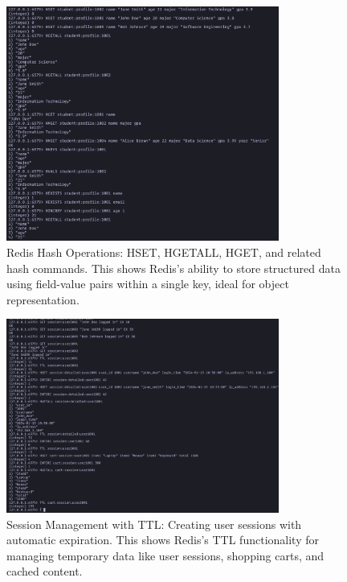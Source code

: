 \begin{figure}[H]
  \centering
  \includegraphics[width=0.8\textwidth]{task-4/screenshots/hash-operations.png}
  \caption{Redis Hash Operations: HSET, HGETALL, HGET, and related hash commands. This shows Redis's ability to store structured data using field-value pairs within a single key, ideal for object representation.}
  \label{fig:hash-operations}
\end{figure}

\begin{figure}[H]
  \centering
  \includegraphics[width=0.8\textwidth]{task-4/screenshots/session-details.png}
  \caption{Session Management with TTL: Creating user sessions with automatic expiration. This shows Redis's TTL functionality for managing temporary data like user sessions, shopping carts, and cached content.}
  \label{fig:session-details}
\end{figure}

